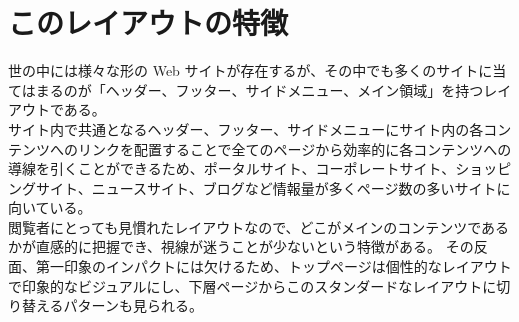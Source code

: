 \section{このレイアウトの特徴}
世の中には様々な形の Web サイトが存在するが、その中でも多くのサイトに当てはまるのが「ヘッダー、フッター、サイドメニュー、メイン領域」を持つレイアウトである。\\

サイト内で共通となるヘッダー、フッター、サイドメニューにサイト内の各コンテンツへのリンクを配置することで全てのページから効率的に各コンテンツへの導線を引くことができるため、ポータルサイト、コーポレートサイト、ショッピングサイト、ニュースサイト、ブログなど情報量が多くページ数の多いサイトに向いている。\\

閲覧者にとっても見慣れたレイアウトなので、どこがメインのコンテンツであるかが直感的に把握でき、視線が迷うことが少ないという特徴がある。\enlargethispage{0.50zw}
その反面、第一印象のインパクトには欠けるため、トップページは個性的なレイアウトで印象的なビジュアルにし、下層ページからこのスタンダードなレイアウトに切り替えるパターンも見られる。
